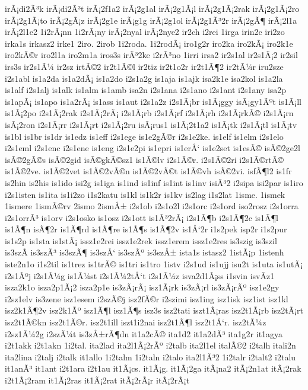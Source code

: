 {irÃ¡di2Ã³k
irÃ¡di2Ã³t
irÃ¡2f1a2
irÃ¡2g1al
irÃ¡2g1Ã¡l
irÃ¡2g1Ã¡2rak
irÃ¡2g1Ã¡2ro
irÃ¡2g1Ã¡to
irÃ¡2gÃ¡z
irÃ¡2g1e
irÃ¡g1g
irÃ¡2g1ol
irÃ¡2g1Ã³2r
irÃ¡2gÃ¶
irÃ¡2l1a
irÃ¡2l1e2
1i2rÃ¡nn
1i2rÃ¡ny
irÃ¡2nyal
irÃ¡2nye2
ir2ch
i2rei
1irga
irin2c
iri2zo
irka1s
irkasz2
irke1
2iro.
2irob
1i2roda.
1i2rodÃ¡
iro1g2r
iro2ka
iro2kÃ¡
iro2k1e
iro2kÃ©r
iro2l1a
iro2m1a
iros3s
irÃ³2ke
i2rÃ³no
1irri
irsa2
ir2s1al
ir2s1Ã¡2
ir2sil
irs3s
ir2s1Ã¼
ir2sz
irtÃ©2
ir2t1Ã©l
ir2tiz
ir2t1o2r
ir2t1Ã¶2
ir2tÃ¼r
iru2sze
i2s1abl
is1a2da
is1a2dÃ¡
is1a2do
i2s1a2g
is1aja
is1ajk
isa2k1e
isa2kol
is1a2la
is1alf
i2s1alj
is1alk
is1alm
is1amb
isa2n
i2s1ana
i2s1ano
i2s1ant
i2s1any
isa2p
is1apÃ¡
is1apo
is1a2rÃ¡
is1ass
is1aut
i2s1a2z
i2s1Ã¡br
is1Ã¡ggy
isÃ¡gy1Ãºt
is1Ã¡ll
is1Ã¡2po
i2s1Ã¡2rak
i2s1Ã¡2rÃ¡
i2s1Ã¡rb
i2s1Ã¡rf
i2s1Ã¡rh
i2s1Ã¡rkÃ©
i2s1Ã¡rn
isÃ¡2ron
i2s1Ã¡rr
i2s1Ã¡rt
i2s1Ã¡2ru
isÃ¡rus1
is1Ã¡2t1a2
is1Ã¡tk
i2s1Ã¡tl
is1Ã¡tv
is1bl
is1br
is1dr
is1edz
is1eff
i2s1ege
is1e2gÃ©r
i2s1e2ke.
is1elf
is1elm
i2s1elo
i2s1eml
i2s1enc
i2s1ene
is1eng
i2s1e2pi
is1epri
is1erÅ‘
is1e2set
is1esÃ©
isÃ©2ge2l
isÃ©2gÃ©s
isÃ©2gid
isÃ©gkÃ©sz1
is1Ã©lv
i2s1Ã©r.
i2s1Ã©2ri
i2s1Ã©rtÃ©
is1Ã©2ve.
is1Ã©2vet
is1Ã©2vÃ©n
is1Ã©2vÃ©t
is1Ã©vh
isÃ©2vi.
isfÃ¶l2
is1fr
is2hin
is2his
is1ido
isi2g
is1iga
is1ind
is1inf
is1int
is1inv
isiÃ³2
i2sipa
isi2par
is1iro
i2s1isten
is1ita
is1i2zo
i1s2katu
is1kl
is1k2r
is1kv
is2lag
i1s2lat
1isme.
1ismek
1ismere
1ismÃ©rv
2ismo
2ismÅ±
i2s1ob
i2s1o2l
i2s1orc
i2s1ord
iso2rosz
i2s1orra
i2s1orrÃ³
is1orv
i2s1osko
is1osz
i2s1ott
is1Ã³2rÃ¡
i2s1Ã¶b
i2s1Ã¶2c
is1Ã¶l
is1Ã¶n
isÃ¶2r
is1Ã¶rd
is1Ã¶re
is1Ã¶s
is1Ã¶2v
is1Å‘2r
i1s2pek
isp2r
i1s2pur
is1s2p
is1sta
is1stÃ¡
issz1e2rei
issz1e2rek
issz1erem
issz1e2res
is3szig
is3szil
is3szÃ­
is3szÃ³
is3szÃ¶
is3szÅ‘
is3szÃº
is3szÅ±
ista1s
istasz2
1istÃ¡p
1istenh
iste2n1o
i1s2til
is1trez
is1trÃ©
is1tri
is1tro
1istv
i2s1ud
is1ujj
isu2t
is1uta
is1utÃ¡
i2s1Ãºj
i2s1Ã¼g
is1Ã¼st
i2s1Ã¼2tÅ‘t
i2s1Ã¼z
isva2d1Ã¡ss
i1svin
isvÃ­z1
isza2k1o
isza2p1Ã¡2
isza2p1e
is3zÃ¡rÃ¡
isz1Ã¡rk
is3zÃ¡rl
is3zÃ¡rÃº
isz1e2gy
i2sz1elv
is3zene
isz1esem
i2szÃ©j
isz2fÃ©r
i2szimi
isz1ing
isz1isk
isz1ist
isz1kl
isz2k1Ã¶2v
isz2k1Ãº
isz1Ã¶l
isz1Ã¶s
isz3s
isz2tati
iszt1Ã¡ras
isz2t1Ã¡rb
isz2tÃ¡rt
isz2t1Ã©kn
isz2t1Ã©r.
isz2t1ill
iszt1i2nai
isz2t1Ã¶l
isz2t1Å‘r.
isz2tÃ¼z
i2sz1Ã¼2g
i2szÃ¼t
is3zÅ±rÃ¶dn
it1a2cÃ©
ita1d2
it1a2dÃ³
ita1g2r
it1agya
i2t1akk
i2t1akn
1i2tal.
ita2lad
ita2l1Ã¡2rÃº
i2talb
ita2l1el
italÃ©2
i2talh
itali2n
ita2lina
i2talj
i2talk
it1allo
1i2talm
1i2taln
i2talo
ita2l1Ã³2
1i2talr
i2talt2
i2talu
it1anÃ³
it1ant
i2t1ara
i2t1au
it1Ã¡cs.
it1Ã¡g.
it1Ã¡2ga
itÃ¡na2
itÃ¡2n1at
itÃ¡2rak
i2t1Ã¡2ram
it1Ã¡2ras
it1Ã¡2rat
itÃ¡2rÃ¡r
itÃ¡2rÃ¡t
}
